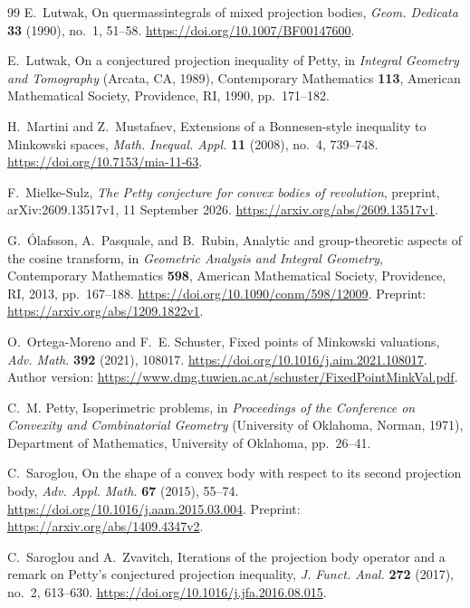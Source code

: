 \begin{thebibliography}{99}
E.~Lutwak, On quermassintegrals of mixed projection bodies,
\emph{Geom. Dedicata} \textbf{33} (1990), no.~1, 51--58.
\url{https://doi.org/10.1007/BF00147600}.

E.~Lutwak, On a conjectured projection inequality of Petty,
in \emph{Integral Geometry and Tomography} (Arcata, CA, 1989),
Contemporary Mathematics \textbf{113}, American Mathematical Society,
Providence, RI, 1990, pp.~171--182.

H.~Martini and Z.~Mustafaev, Extensions of a Bonnesen-style inequality
to Minkowski spaces, \emph{Math. Inequal. Appl.} \textbf{11} (2008),
no.~4, 739--748.
\url{https://doi.org/10.7153/mia-11-63}.

F.~Mielke-Sulz, \emph{The Petty conjecture for convex bodies of revolution},
preprint, arXiv:2609.13517v1, 11 September 2026.
\url{https://arxiv.org/abs/2609.13517v1}.

G.~\'Olafsson, A.~Pasquale, and B.~Rubin,
Analytic and group-theoretic aspects of the cosine transform,
in \emph{Geometric Analysis and Integral Geometry},
Contemporary Mathematics \textbf{598}, American Mathematical Society,
Providence, RI, 2013, pp.~167--188.
\url{https://doi.org/10.1090/conm/598/12009}.
Preprint: \url{https://arxiv.org/abs/1209.1822v1}.

O.~Ortega-Moreno and F.~E. Schuster, Fixed points of Minkowski valuations,
\emph{Adv. Math.} \textbf{392} (2021), 108017.
\url{https://doi.org/10.1016/j.aim.2021.108017}.
Author version: \url{https://www.dmg.tuwien.ac.at/schuster/FixedPointMinkVal.pdf}.

C.~M. Petty, Isoperimetric problems,
in \emph{Proceedings of the Conference on Convexity and Combinatorial Geometry}
(University of Oklahoma, Norman, 1971),
Department of Mathematics, University of Oklahoma, pp.~26--41.

C.~Saroglou, On the shape of a convex body with respect to its second projection body,
\emph{Adv. Appl. Math.} \textbf{67} (2015), 55--74.
\url{https://doi.org/10.1016/j.aam.2015.03.004}.
Preprint: \url{https://arxiv.org/abs/1409.4347v2}.

C.~Saroglou and A.~Zvavitch, Iterations of the projection body operator and a remark
on Petty's conjectured projection inequality,
\emph{J. Funct. Anal.} \textbf{272} (2017), no.~2, 613--630.
\url{https://doi.org/10.1016/j.jfa.2016.08.015}.


\end{thebibliography}
